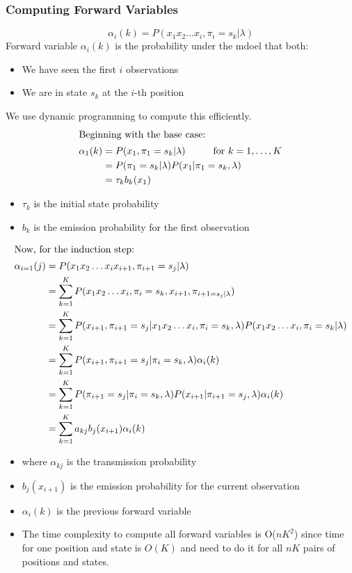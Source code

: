 \documentclass[10pt]{article}
\begin{document}
\subsubsection*{Computing Forward Variables}
\[\alpha_i(k) = P(x_1 x_2 \dots x_i, \pi_i = s_k | \lambda)\]
Forward variable $\alpha_i(k)$ is the probability under the mdoel that both:
\begin{itemize}
	\item We have seen the first $i$ observations
	\item We are in state $s_k$ at the $i$-th position
\end{itemize}
We use dynamic programming to compute this efficiently.
\begin{align*}
    \intertext{Beginning with the base case:}
    \alpha_1(k) &= P(x_1, \pi_1 = s_k | \lambda) \hspace{1cm} \text{for } k = 1, \dots, K\\
    &= P(\pi_1 = s_k | \lambda) P(x_1 | \pi_1 = s_k, \lambda)\\
    &= \tau_k b_k (x_1)
\end{align*}
\begin{itemize}
	\item $\tau_k$ is the initial state probability
	\item $b_k$ is the emission probability for the first observation
\end{itemize}
\begin{align*}
    \intertext{Now, for the induction step:}
    \alpha_{i = 1}(j) &= P(x_1 x_2 \dots x_i x_{i + 1}, \pi_{i + 1} = s_j | \lambda)\\
    &= \sum_{k = 1}^K P(x_1 x_2 \dots x_i, \pi_i = s_k, x_{i + 1}, \pi_{i + 1 = s_j | \lambda})\\
    &= \sum_{k = 1}^K P(x_{i + 1}, \pi_{i + 1} = s_j | x_1 x_2 \dots x_i, \pi_i = s_k, \lambda) P(x_1 x_2 \dots x_i, \pi_i = s_k | \lambda)\\
    &= \sum_{k = 1}^K P(x_{i + 1}, \pi_{i + 1} = s_j | \pi_i = s_k, \lambda) \alpha_i(k)\\
    &= \sum_{k = 1}^K P(\pi_{i + 1} = s_j | \pi_i = s_k, \lambda) P(x_{i + 1} | \pi_{i + 1} = s_j, \lambda) \alpha_i(k)\\
    &= \sum_{k = 1}^K a_{kj} b_j (x_{i + 1})\alpha_i(k)
\end{align*}
\begin{itemize}
	\item where $\alpha_{kj}$ is the transmission probability
	\item $b_j(x_{i + 1})$ is the emission probability for the current observation
	\item $\alpha_i(k)$ is the previous forward variable
	\item The time complexity to compute all forward variables is O($nK^2$) since time for one position and state is $O(K)$ and need to do it for all $nK$ pairs of positions and states.
\end{itemize}
\end{document}
